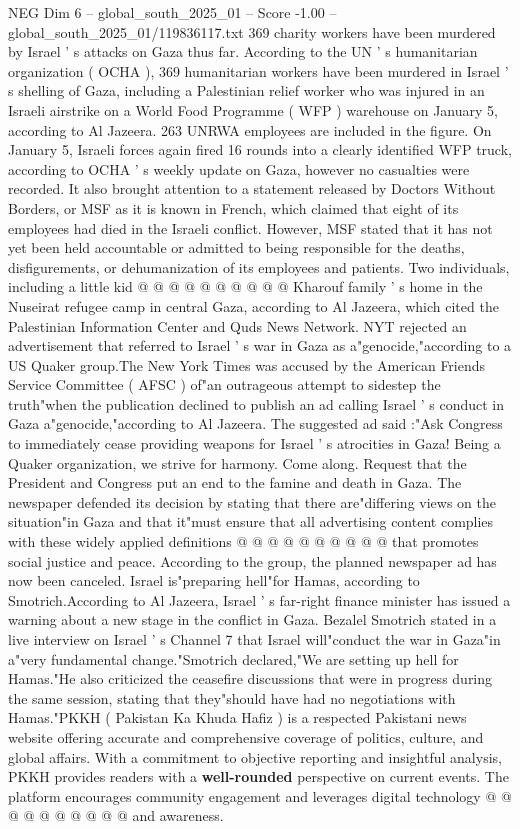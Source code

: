 \begin{textsample}{NEG Dim 6 – global\_south\_2025\_01 – Score -1.00 – global\_south\_2025\_01/119836117.txt}  \label{ex:f6_neg_018}
369 charity workers have been murdered by Israel ' s attacks on Gaza thus far.
According to the UN ' s humanitarian organization ( OCHA ), 369 humanitarian workers have been murdered in Israel ' s shelling of Gaza, including a Palestinian relief worker who was injured in an Israeli airstrike on a World Food Programme ( WFP ) warehouse on January 5, according to Al Jazeera. 263 UNRWA employees are included in the figure.
On January 5, Israeli forces again fired 16 rounds into a clearly identified WFP truck, according to OCHA ' s weekly update on Gaza, however no casualties were recorded.
It also brought attention to a statement released by Doctors Without Borders, or MSF as it is known in French, which claimed that eight of its employees had died in the Israeli conflict.
However, MSF stated that it has not yet been held accountable or admitted to being responsible for the deaths, disfigurements, or dehumanization of its employees and patients.
Two individuals, including a little kid @ @ @ @ @ @ @ @ @ @ Kharouf family ' s home in the Nuseirat refugee camp in central Gaza, according to Al Jazeera, which cited the Palestinian Information Center and Quds News Network.
NYT rejected an advertisement that referred to Israel ' s war in Gaza as a"genocide,"according to a US Quaker group.The New York Times was accused by the American Friends Service Committee ( AFSC ) of"an outrageous attempt to sidestep the truth"when the publication declined to publish an ad calling Israel ' s conduct in Gaza a"genocide,"according to Al Jazeera.
The suggested ad said :"Ask Congress to immediately cease providing weapons for Israel ' s atrocities in Gaza!
Being a Quaker organization, we strive for harmony.
Come along.
Request that the President and Congress put an end to the famine and death in Gaza.
The newspaper defended its decision by stating that there are"differing views on the situation"in Gaza and that it"must ensure that all advertising content complies with these widely applied definitions @ @ @ @ @ @ @ @ @ @ that promotes social justice and peace.
According to the group, the planned newspaper ad has now been canceled.
Israel is"preparing hell"for Hamas, according to Smotrich.According to Al Jazeera, Israel ' s far-right finance minister has issued a warning about a new stage in the conflict in Gaza.
Bezalel Smotrich stated in a live interview on Israel ' s Channel 7 that Israel will"conduct the war in Gaza"in a"very fundamental change."Smotrich declared,"We are setting up hell for Hamas."He also criticized the ceasefire discussions that were in progress during the same session, stating that they"should have had no negotiations with Hamas."PKKH ( Pakistan Ka Khuda Hafiz ) is a respected Pakistani news website offering accurate and comprehensive coverage of politics, culture, and global affairs.
With a commitment to objective reporting and insightful analysis, PKKH provides readers with a \textbf{well-rounded} perspective on current events.
The platform encourages community engagement and leverages digital technology @ @ @ @ @ @ @ @ @ @ and awareness.

\end{textsample}
